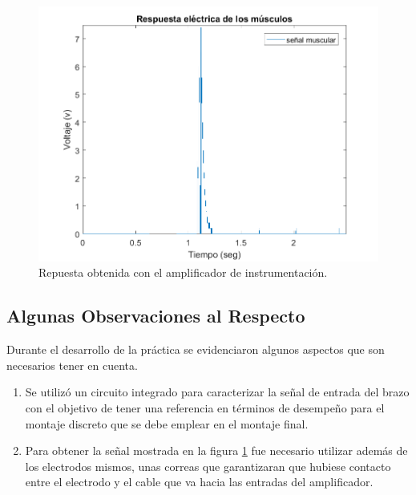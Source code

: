 \begin{figure}[H]
  \centering
  \includegraphics[width=1\textwidth]{Capitulo_1/resultadoopamp.png}
  \caption{Repuesta obtenida con el amplificador de instrumentación.}
  \label{fig:resopamp} 
\end{figure}

\subsection{Algunas Observaciones al Respecto}

Durante el desarrollo de la práctica se evidenciaron algunos aspectos que son necesarios tener en cuenta.

\begin{enumerate}
\item Se utilizó un circuito integrado para caracterizar la señal de entrada del brazo con el objetivo de tener una referencia en términos de desempeño para el montaje discreto que se debe emplear en el montaje final.
\item Para obtener la señal mostrada en la figura \ref{fig:resopamp} fue necesario utilizar además de los electrodos mismos, unas correas que garantizaran que hubiese contacto entre el electrodo y el cable que va hacia las entradas del amplificador. 
\end{enumerate}



